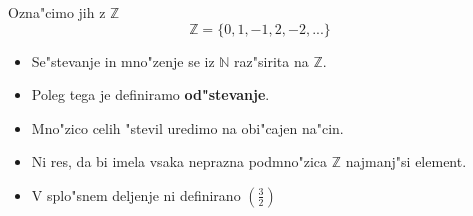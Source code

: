 Ozna"cimo jih z \(\mathbb{Z} \)
\[\mathbb{Z} = \{0, 1, -1, 2, -2, ...\} \]

\begin{itemize}
	\item Se"stevanje in mno"zenje se iz \(\mathbb{N} \) raz"sirita na \(\mathbb{Z} \). 
	\item Poleg tega je definiramo \textbf{od"stevanje}.
	\item Mno"zico celih "stevil uredimo na obi"cajen na"cin.
	\item Ni res, da bi imela vsaka neprazna podmno"zica \(\mathbb{Z} \) najmanj"si element.
	\item V splo"snem deljenje ni definirano \(\left(\frac{3}{2} \right)\)
\end{itemize}

